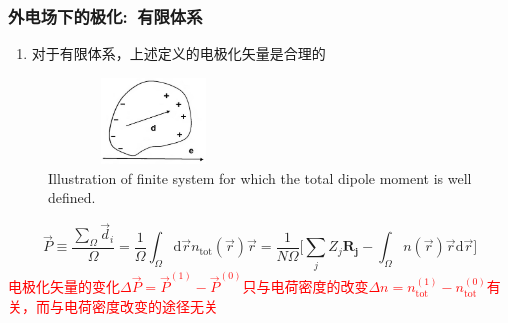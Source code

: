 {\frame
{
	\frametitle{外电场下的极化:~有限体系}
			\begin{enumerate}
				\item 对于有限体系，上述定义的电极化矢量是合理的
			\end{enumerate}
\begin{figure}[h!]
\centering
\vspace*{-0.08in}
\includegraphics[height=0.9in,width=2.2in,viewport=0 0 1100 550,clip]{Figures/Polarize_insulator.png}
\caption{\tiny \textrm{Illustration of finite system for which the total dipole moment is well defined.}}%
\label{Polarization_insulator}
\end{figure} 
\fontsize{8.5pt}{2.2pt}\selectfont{对有限体系，当外部电场$\vec E(\vec r)=0$，宏观电极化矢量$\vec P$可用偶极矩$\vec d$表示}
\begin{displaymath}
	\vec P\equiv\frac{\sum\limits_{\Omega}\vec d_i}{\Omega}=\frac1{\Omega}\int_{\Omega}\mathrm{d}\vec rn_{\mathrm{tot}}(\vec r)\vec r=\dfrac1{N\Omega}\bigg[\sum_jZ_j\mathbf{R_j}-\int_{\Omega}n(\vec r)\vec r\mathrm{d}\vec r\bigg]
\end{displaymath}
\textcolor{red}{电极化矢量的变化$\Delta\vec P=\vec P^{(1)}-\vec P^{(0)}$只与电荷密度的改变$\Delta n=n_{\mathrm{tot}}^{(1)}-n_{\mathrm{tot}}^{(0)}$有关，而与电荷密度改变的途径无关}
}

}
